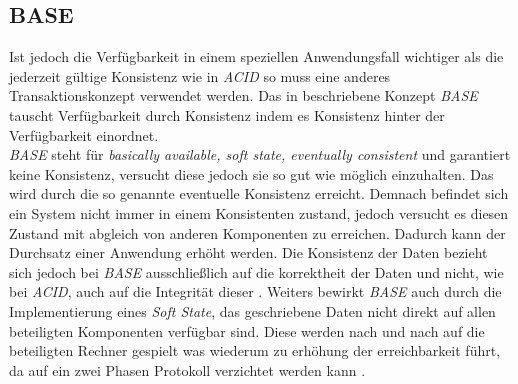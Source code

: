 \subsection{BASE}\label{sec:transactionTheory:base}
Ist jedoch die Verfügbarkeit in einem speziellen Anwendungsfall wichtiger als die jederzeit gültige Konsistenz wie in \textit{ACID} so muss eine anderes Transaktionskonzept verwendet werden. Das in \cite{PritchettBASE} beschriebene Konzept \textit{BASE} tauscht Verfügbarkeit durch Konsistenz indem es Konsistenz hinter der Verfügbarkeit einordnet. \\
\textit{BASE} steht für \textit{basically available, soft state, eventually consistent} und garantiert keine Konsistenz, versucht diese jedoch sie so gut wie möglich einzuhalten. Das wird durch die so genannte eventuelle Konsistenz erreicht. Demnach befindet sich ein System nicht immer in einem Konsistenten zustand, jedoch versucht es diesen Zustand mit abgleich von anderen Komponenten zu erreichen. Dadurch kann der Durchsatz einer Anwendung erhöht werden. Die Konsistenz der Daten bezieht sich jedoch bei \textit{BASE} ausschließlich auf die korrektheit der Daten und nicht, wie bei \textit{ACID}, auch auf die Integrität dieser \citep{EdlichFriedlandHampeBrauer201010}. Weiters bewirkt \textit{BASE} auch durch die Implementierung eines \textit{Soft State}, das geschriebene Daten nicht direkt auf allen beteiligten Komponenten verfügbar sind. Diese werden nach und nach auf die beteiligten Rechner gespielt was wiederum zu erhöhung der erreichbarkeit führt, da auf ein zwei Phasen Protokoll verzichtet werden kann \citep{EdlichFriedlandHampeBrauer201010}.

